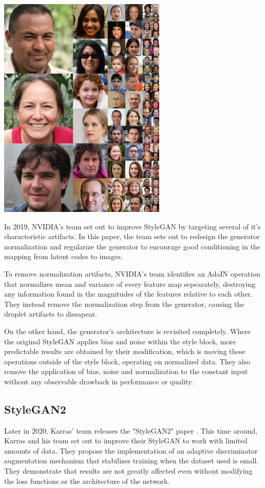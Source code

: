 \documentclass[journal,onecolumn]{IEEEtran}
\newenvironment{Figure}
  {\par\medskip\noindent\minipage{\linewidth}}
  {\endminipage\par\medskip}
\begin{document}
\begin{Figure}
 \centering
 \includegraphics[width=8cm]{resources/styleface.png}
 \label{fig:style_face}
\end{Figure}

In 2019, NVIDIA's team set out to improve StyleGAN by targeting several of it's characteristic artifacts\cite{DBLP:journals/corr/abs-1912-04958}. In this paper, the team sets out to redesign the generator normalization and regularize the generator to encourage good conditioning in the mapping from latent codes to images. 

To remove normalization artifacts, NVIDIA's team identifies an AdaIN operation that normalizes mean and variance of every feature map sepearately, destroying any information found in the magnitudes of the features relative to each other. They instead remove the normalization step from the generator, causing the droplet artifacts to dissapear.

On the other hand, the generator's architecture is revisited completely. Where the original StyleGAN applies bias and noise within the style block, more predictable results are obtained by their modification, which is moving these operations outside of the style block, operating on normalized data. They also remove the application of bias, noise and normalization to the constant input without any observable drawback in performance or quality.

\subsection{StyleGAN2}
Later in 2020, Karras' team releases the "StyleGAN2" paper \cite{DBLP:journals/corr/abs-2006-06676}. This time around, Karras and his team set out to improve their StyleGAN to work with limited amounts of data. They propose the implementation of an adaptive discriminator augmentation mechanism that stabilizes training when the dataset used is small. They demonstrate that results are not greatly affected even without modifying the loss functions or the architecture of the network.
\end{document}
